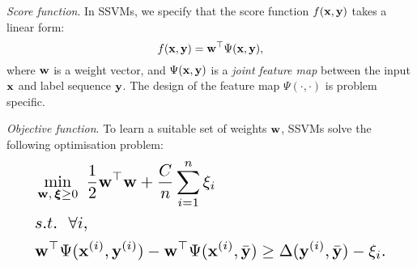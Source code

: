 \emph{Score function}. In SSVMs, we specify that the score function $f(\mathbf{x}, \mathbf{y})$ takes a linear form:
\begin{equation*}
f(\mathbf{x}, \mathbf{y}) = \mathbf{w}^\top \Psi(\mathbf{x}, \mathbf{y}),
\end{equation*}
where $\mathbf{w}$ is a weight vector, and $\Psi(\mathbf{x}, \mathbf{y})$ is a \emph{joint feature map}
between the input $\mathbf{x}$ and label sequence $\mathbf{y}$.
The design of the feature map $\Psi(\cdot,\cdot)$ is problem specific.

\emph{Objective function}.
To learn a suitable set of weights $\mathbf{w}$, SSVMs solve the following optimisation problem:
\begin{equation}
\label{eq:nslack}
\resizebox{0.9\linewidth}{!}{$\displaystyle
\begin{aligned}
&\min_{\w, \, \bm{\xi} \ge 0} ~\frac{1}{2} \w^\top \w + \frac{C}{n} \sum_{i=1}^n \xi_i \\
&s.t.~~  \forall i, \\
& \w^\top \Psi(\x^{(i)}, \y^{(i)}) - \w^\top \Psi(\x^{(i)}, \bar{\y}) \ge
  \Delta(\y^{(i)}, \bar{\y}) - \xi_i.
\end{aligned}
$}
\end{equation}


